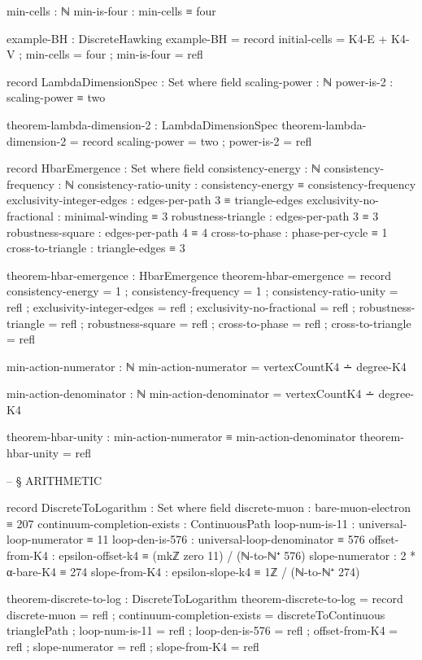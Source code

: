 \documentclass[11pt,a4paper]{book}
\begin{document}
\begin{code}
      min-cells : ℕ
      min-is-four : min-cells ≡ four
      
  example-BH : DiscreteHawking
  example-BH = record
    { initial-cells = K4-E + K4-V
    ; min-cells = four
    ; min-is-four = refl
    }

record LambdaDimensionSpec : Set where
  field
    scaling-power : ℕ
    power-is-2 : scaling-power ≡ two

theorem-lambda-dimension-2 : LambdaDimensionSpec
theorem-lambda-dimension-2 = record
  { scaling-power = two
  ; power-is-2 = refl
  }

record HbarEmergence : Set where
  field
    consistency-energy    : ℕ
    consistency-frequency : ℕ
    consistency-ratio-unity : consistency-energy ≡ consistency-frequency
    exclusivity-integer-edges : edges-per-path 3 ≡ triangle-edges
    exclusivity-no-fractional : minimal-winding ≡ 3
    robustness-triangle : edges-per-path 3 ≡ 3
    robustness-square : edges-per-path 4 ≡ 4
    cross-to-phase : phase-per-cycle ≡ 1
    cross-to-triangle : triangle-edges ≡ 3

theorem-hbar-emergence : HbarEmergence
theorem-hbar-emergence = record
  { consistency-energy = 1
  ; consistency-frequency = 1
  ; consistency-ratio-unity = refl
  ; exclusivity-integer-edges = refl
  ; exclusivity-no-fractional = refl
  ; robustness-triangle = refl
  ; robustness-square = refl
  ; cross-to-phase = refl
  ; cross-to-triangle = refl
  }

min-action-numerator : ℕ
min-action-numerator = vertexCountK4 ∸ degree-K4

min-action-denominator : ℕ  
min-action-denominator = vertexCountK4 ∸ degree-K4

theorem-hbar-unity : min-action-numerator ≡ min-action-denominator
theorem-hbar-unity = refl


-- § ARITHMETIC

record DiscreteToLogarithm : Set where
  field
    discrete-muon : bare-muon-electron ≡ 207
    continuum-completion-exists : ContinuousPath
    loop-num-is-11 : universal-loop-numerator ≡ 11
    loop-den-is-576 : universal-loop-denominator ≡ 576
    offset-from-K4 : epsilon-offset-k4 ≡ (mkℤ zero 11) / (ℕ-to-ℕ⁺ 576)
    slope-numerator : 2 * α-bare-K4 ≡ 274
    slope-from-K4 : epsilon-slope-k4 ≡ 1ℤ / (ℕ-to-ℕ⁺ 274)

theorem-discrete-to-log : DiscreteToLogarithm
theorem-discrete-to-log = record
  { discrete-muon = refl
  ; continuum-completion-exists = discreteToContinuous trianglePath
  ; loop-num-is-11 = refl
  ; loop-den-is-576 = refl
  ; offset-from-K4 = refl
  ; slope-numerator = refl
  ; slope-from-K4 = refl
  }


\end{code}
\end{document}
